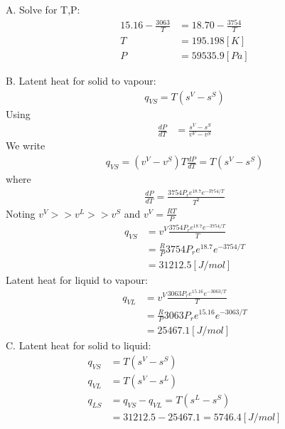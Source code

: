 \documentclass{article}
\numberwithin{equation}{section}
\begin{document}
A. Solve for T,P:
\begin{align*}
15.16-\frac{3063}{T}&=18.70-\frac{3754}{T}\\
T&=195.198[K]\\
P&=59535.9[Pa]
\end{align*}

B. Latent heat for solid to vapour:
\begin{align*}
q_{VS}=T(s^V-s^S)
\end{align*}
Using
\begin{align*}
\frac{dP}{dT}&=\frac{s^V-s^S}{v^V-v^S}
\end{align*}
We write
\begin{align*}
q_{VS}=(v^V-v^S)T\frac{dP}{dT}=T(s^V-s^S)
\end{align*}
where
\begin{align*}
\frac{dP}{dT}=\frac{3754P_re^{18.7}e^{-3754/T}}{T^2}
\end{align*}
Noting $v^V>>v^L>>v^S$ and $v^V=\frac{RT}{P}$
\begin{align*}
q_{VS}&=v^V\frac{3754P_re^{18.7}e^{-3754/T}}{T}\\
&=\frac{R}{P}3754P_re^{18.7}e^{-3754/T}\\
&=31212.5 [J/mol]
\end{align*}
Latent heat for liquid to vapour:
\begin{align*}
q_{VL}&=v^V\frac{3063P_re^{15.16}e^{-3063/T}}{T}\\
&=\frac{R}{P}3063P_re^{15.16}e^{-3063/T}\\
&=25467.1 [J/mol]
\end{align*}
C. Latent heat for solid to liquid:
\begin{align*}
q_{VS}&=T(s^V-s^S)\\
q_{VL}&=T(s^V-s^L)\\
q_{LS}&=q_{VS}-q_{VL}=T(s^L-s^S)\\
&=31212.5-25467.1=5746.4[J/mol]
\end{align*}
\newpage
\end{document}
